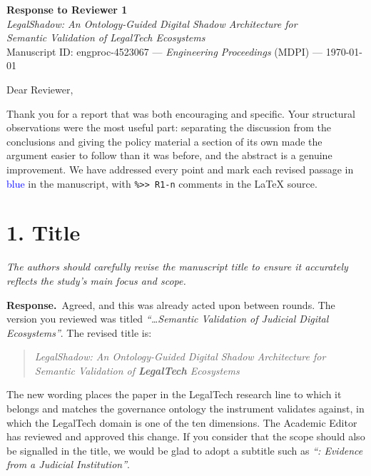 \documentclass[11pt,a4paper]{article}
\newenvironment{comment}
  {\begin{mdframed}[backgroundcolor=cmtbg, linecolor=cmtrule, linewidth=0.6pt,
     innertopmargin=5pt, innerbottommargin=5pt, innerleftmargin=7pt,
     innerrightmargin=7pt, skipabove=4pt, skipbelow=6pt]\itshape}
  {\end{mdframed}}
\newcommand{\resp}{\par\noindent\textbf{Response.}\ }
\begin{document}
\begin{center}
{\Large\bfseries Response to Reviewer 1}\\[4pt]
{\large \emph{LegalShadow: An Ontology-Guided Digital Shadow Architecture for\\ Semantic Validation of LegalTech Ecosystems}}\\[5pt]
Manuscript ID: engproc-4523067 --- \emph{Engineering Proceedings} (MDPI) --- \today
\end{center}

\vspace{4pt}
\noindent Dear Reviewer,

\vspace{3pt}
\noindent Thank you for a report that was both encouraging and specific. Your structural observations were the most useful part: separating the discussion from the conclusions and giving the policy material a section of its own made the argument easier to follow than it was before, and the abstract is a genuine improvement. We have addressed every point and mark each revised passage in \textcolor{blue}{blue} in the manuscript, with \verb|%>> R1-n| comments in the \LaTeX{} source.

\section*{1. Title}
\begin{comment}
The authors should carefully revise the manuscript title to ensure it accurately reflects the study's main focus and scope.
\end{comment}
\resp Agreed, and this was already acted upon between rounds. The version you reviewed was titled \emph{``\dots Semantic Validation of Judicial Digital Ecosystems''}. The revised title is:
\begin{quote}
\emph{LegalShadow: An Ontology-Guided Digital Shadow Architecture for Semantic Validation of \textbf{LegalTech} Ecosystems}
\end{quote}
The new wording places the paper in the LegalTech research line to which it belongs and matches the governance ontology the instrument validates against, in which the LegalTech domain is one of the ten dimensions. The Academic Editor has reviewed and approved this change. If you consider that the scope should also be signalled in the title, we would be glad to adopt a subtitle such as \emph{``: Evidence from a Judicial Institution''}.
\end{document}
